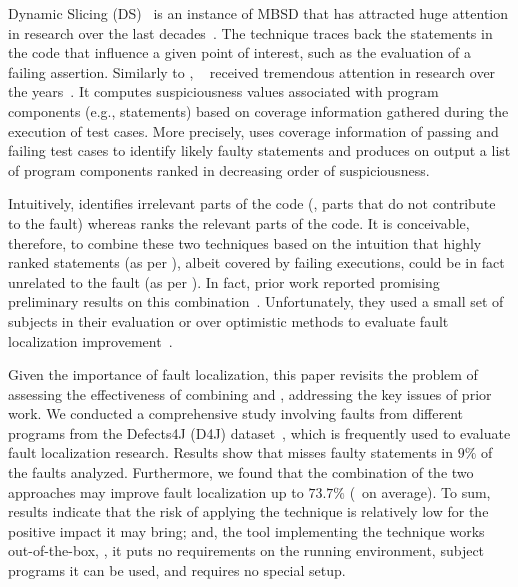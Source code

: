 \documentclass{article}
\begin{document}
Dynamic Slicing (DS)~\cite{Agrawal:1990:DPS:93542.93576} is an
instance of MBSD that has attracted huge attention in research over
the last decades~\cite{Silva:2012:VPS:2187671.2187674}. The technique
traces back the statements in the code that influence a given point of
interest, such as the evaluation of a failing assertion.  Similarly to
\ds{}, \sfl{}~\cite{DBLP:journals/stvr/HarroldRSWY00} received
tremendous attention in research over the years~\cite{7390282}.  It
computes suspiciousness values associated with program components
(e.g., statements) based on coverage information gathered during the
execution of test cases.  More precisely, \sfl{} uses coverage
information of passing and failing test cases to identify likely
faulty statements and produces on output a list of program components
ranked in decreasing order of suspiciousness.


Intuitively, \ds{} identifies irrelevant parts of the code (\ie{},
parts that do not contribute to the fault) whereas \sfl{} ranks the
relevant parts of the code. It is conceivable, therefore, to combine
these two techniques based on the intuition that highly ranked
statements (as per \sfl{}), albeit covered by failing executions,
could be in fact unrelated to the fault (as per \ds{}). In fact, prior
work reported promising preliminary results on this
combination~\cite{Wotawa:2010:FLB:1848650.1849235,Alves:2011:FUD:2190078.2190115,DBLP:conf/ecai/HoferW12,lei-mao-dai-wang-2012,slicing-sfl-repair}.
Unfortunately, they used a small set of subjects in their evaluation
or over optimistic methods to evaluate fault localization
improvement~\cite{Wu:2014:CLC:2610384.2610386,Lucia:2014:FFL:2642937.2642983,Wen:2016:LLB:2970276.2970359}.

Given the importance of fault localization, this paper revisits the
problem of assessing the effectiveness of combining \ds{} and \sfl{},
addressing the key issues of prior work. We conducted a comprehensive
study involving \numFaults{} faults from \numPrograms{} different
programs from the Defects4J (D4J)
dataset~\cite{just-defects4j-issta2014}, which is frequently used to
evaluate fault localization research. Results show that \ds{} misses
faulty statements in $9\%$ of the \numFaults{}
faults analyzed. Furthermore, we found that the combination of the two
approaches may improve fault localization up to $73.7\%$ (\avgImprov\ on average).
 To sum, results indicate that the
risk of applying the technique is relatively low for the positive
impact it may bring; and, the tool implementing the technique works
out-of-the-box, \ie{}, it puts no requirements on the running
environment, subject programs it can be used, and requires no special
setup.
\end{document}
